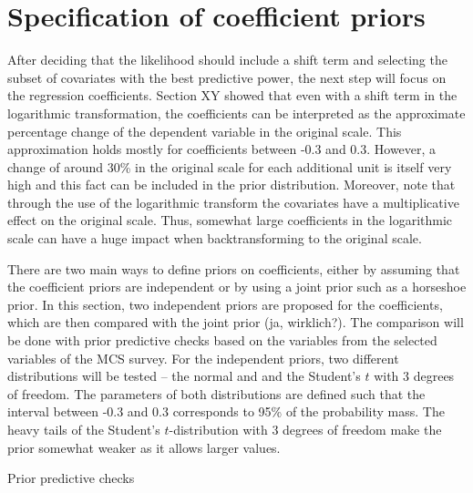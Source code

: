 \section{Specification of coefficient priors}

After deciding that the likelihood should include a shift term and selecting the subset of covariates with the best predictive power, the next step will focus on the regression coefficients.
Section XY showed that even with a shift term in the logarithmic transformation, the coefficients can be interpreted as the approximate percentage change of the dependent variable in the original scale.
This approximation holds mostly for coefficients between -0.3 and 0.3.
However, a change of around 30\% in the original scale for each additional unit is itself very high and this fact can be included in the prior distribution.
Moreover, note that through the use of the logarithmic transform the covariates have a multiplicative effect on the original scale.
Thus, somewhat large coefficients in the logarithmic scale can have a huge impact when backtransforming to the original scale.

There are two main ways to define priors on coefficients, either by assuming that the coefficient priors are independent or by using a joint prior such as a horseshoe prior.
In this section, two independent priors are proposed for the coefficients, which are then compared with the joint prior (ja, wirklich?).
The comparison will be done with prior predictive checks based on the variables from the selected variables of the MCS survey.
For the independent priors, two different distributions will be tested – the normal and and the Student's $t$ with 3 degrees of freedom.
The parameters of both distributions are defined such that the interval between -0.3 and 0.3 corresponds to
95\% of the probability mass.
The heavy tails of the Student's $t$-distribution with 3 degrees of freedom make the prior somewhat weaker as it allows larger values.

Prior predictive checks




